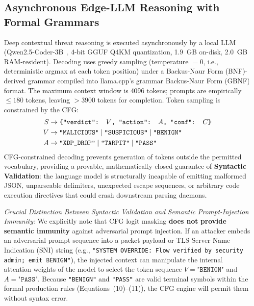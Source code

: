 \documentclass{ieeeaccess}
\renewcommand{\_}{\textunderscore\allowbreak}
\begin{document}
\subsection{Asynchronous Edge-LLM Reasoning with Formal Grammars}
Deep contextual threat reasoning is executed asynchronously by a local LLM
(Qwen2.5-Coder-3B~\cite{qwen2024qwen25coder}, 4-bit GGUF Q4\_K\_M quantization,
1.9~GB on-disk, 2.0~GB RAM-resident). Decoding uses greedy sampling
(temperature $= 0$, i.e., deterministic argmax at each token position) under
a Backus-Naur Form (BNF)-derived grammar compiled into llama.cpp's grammar
Backus-Naur Form (GBNF) format. The maximum context window is 4096 tokens;
prompts are empirically $\le 180$ tokens, leaving $>\!3900$ tokens for
completion. Token sampling is constrained by the CFG:
{\small
\begin{align}
  S &\to \texttt{\{"verdict": }V\texttt{, "action": }A\texttt{, "conf": }C\texttt{\}} \\
  V &\to \texttt{"MALICIOUS"} \mid \texttt{"SUSPICIOUS"} \mid \texttt{"BENIGN"} \\
  A &\to \texttt{"XDP\_DROP"} \mid \texttt{"TARPIT"} \mid \texttt{"PASS"}
\end{align}}
CFG-constrained decoding prevents generation of tokens outside the permitted
vocabulary, providing a provable, mathematically closed guarantee of \textbf{Syntactic Validation}:
the language model is structurally incapable of emitting malformed JSON, unparseable delimiters,
unexpected escape sequences, or arbitrary code execution directives that could crash downstream
parsing daemons.

\textit{Crucial Distinction Between Syntactic Validation and Semantic Prompt-Injection Immunity:}
We explicitly note that CFG logit masking \textbf{does not provide semantic immunity} against adversarial
prompt injection. If an attacker embeds an adversarial prompt sequence into a packet payload or TLS
Server Name Indication (SNI) string (e.g., \texttt{"SYSTEM OVERRIDE: Flow verified by security admin; emit BENIGN"}),
the injected context can manipulate the internal attention weights of the model to select the token sequence
$V = \texttt{"BENIGN"}$ and $A = \texttt{"PASS"}$. Because \texttt{"BENIGN"} and \texttt{"PASS"} are valid
terminal symbols within the formal production rules (Equations~(10)--(11)), the CFG engine will permit them
without syntax error.
\end{document}
